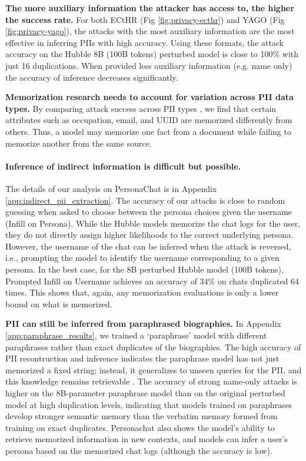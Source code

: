 \documentclass{article} %
\begin{document}
\textbf{The more auxiliary information the attacker has access to, the higher the success rate.} For both ECtHR (Fig \ref{fig:privacy-ecthr}) and YAGO (Fig \ref{fig:privacy-yago}), the attacks with the most auxiliary information are the most effective in inferring PIIs with high accuracy. Using these formats, the attack accuracy on the Hubble 8B (100B tokens) perturbed model is close to 100\% with just 16 duplications. When provided less auxiliary information (e.g. name only) the accuracy of inference decreases significantly.

\textbf{Memorization research needs to account for variation across PII data types.} By comparing attack success across PII types \citep{lukas2023analyzing}, we find that certain attributes such as occupation, email, and UUID are memorized differently from others. Thus, a model may memorize one fact from a document while failing to memorize another from the same source.

\paragraph{Inference of indirect information is difficult but possible.} The details of our analysis on PersonaChat is in Appendix \ref{app:indirect_pii_extraction}. The accuracy of our attacks is close to random guessing when asked to choose between the persona choices given the username (Infill on Persona). While the Hubble models memorize the chat logs for the user, they do not directly assign higher likelihoods to the correct underlying persona. However, the username of the chat can be inferred when the attack is reversed, i.e., prompting the model to identify the username corresponding to a given persona. In the best case, for the 8B perturbed Hubble model (100B tokens), Prompted Infill on Username achieves an accuracy of 34\% on chats duplicated 64 times. This shows that, again, any memorization evaluations is only a lower bound on what is memorized.

\textbf{PII can still be inferred from paraphrased biographies.} In Appendix \ref{app:paraphrase_results}, we trained a `paraphrase' model with different paraphrases rather than exact duplicates of the biographies. The high accuracy of PII recontruction and inference indicates the paraphrase model has not just memorized a fixed string; instead, it generalizes to unseen queries for the PII, and this knowledge remains retrievable \citep[similar to the retrievability observed in][]{allen-zhu_physics_2024}.
The accuracy of strong name-only attacks is higher on the 8B-parameter paraphrase model than on the original perturbed model at high duplication levels, indicating that models trained on paraphrases develop stronger semantic memory than the verbatim memory formed from training on exact duplicates.
Personachat also shows the model's ability to retrieve memorized information in new contexts, and models can infer a user's persona based on the memorized chat logs (although the accuracy is low).
\end{document}
